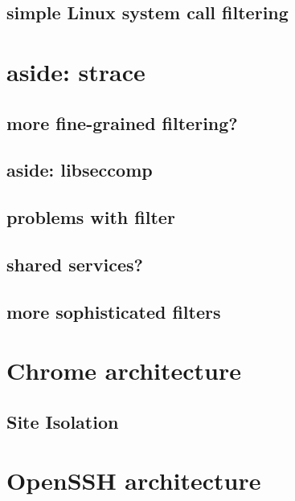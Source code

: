 \subsection{simple Linux system call filtering}


\section{aside: strace}


\subsection{more fine-grained filtering?}




\subsection{aside: libseccomp}


\subsection{problems with filter}


\subsection{shared services?}


\subsection{more sophisticated filters}
\section{Chrome architecture}


\subsection{Site Isolation}


\section{OpenSSH architecture}


